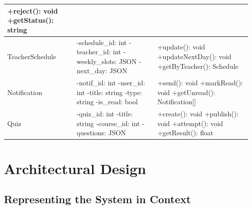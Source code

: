 \documentclass[12pt,a4paper]{article}
\begin{document}
\begin{longtable}{|p{2.8cm}|p{5.5cm}|p{5.2cm}|}
+reject(): void \newline
+getStatus(): string \\
\hline
TeacherSchedule &
-schedule\_id: int \newline
-teacher\_id: int \newline
-weekly\_slots: JSON \newline
-next\_day: JSON &
+update(): void \newline
+updateNextDay(): void \newline
+getByTeacher(): Schedule \\
\hline
Notification &
-notif\_id: int \newline
-user\_id: int \newline
-title: string \newline
-type: string \newline
-is\_read: bool &
+send(): void \newline
+markRead(): void \newline
+getUnread(): Notification[] \\
\hline
Quiz &
-quiz\_id: int \newline
-title: string \newline
-course\_id: int \newline
-questions: JSON &
+create(): void \newline
+publish(): void \newline
+attempt(): void \newline
+getResult(): float \\
\hline
\end{longtable}
\newpage

\newpage
\section{Architectural Design}

\subsection{Representing the System in Context}
\end{document}
